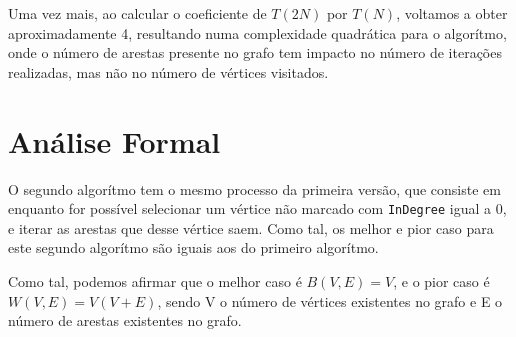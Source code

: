 Uma vez mais, ao calcular o coeficiente de $T(2N)$ por
$T(N)$, voltamos a obter aproximadamente 4, resultando numa complexidade quadrática para o algorítmo, onde o número de arestas presente no grafo tem
impacto no número de iterações realizadas, mas não no número
de vértices visitados.

\section{Análise Formal}

O segundo algorítmo tem o mesmo processo da primeira versão,
que consiste em enquanto for possível selecionar um vértice
não marcado com \verb|InDegree| igual a 0, e iterar as
arestas que desse vértice saem. Como tal, os melhor e pior
caso para este segundo algorítmo são iguais aos do primeiro
algorítmo.

Como tal, podemos afirmar que o melhor caso é $B(V, E) = V$,
e o pior caso é $W(V,E) = V(V+E)$, sendo V o número de
vértices existentes no grafo e E o número de arestas
existentes no grafo.
